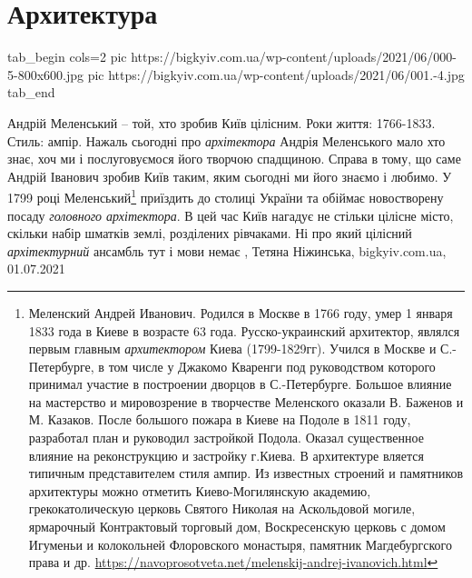  
 
 
 
 
\chapter{Архитектура}


\ifcmt
  tab_begin cols=2
     pic https://bigkyiv.com.ua/wp-content/uploads/2021/06/000-5-800x600.jpg
     pic https://bigkyiv.com.ua/wp-content/uploads/2021/06/001.-4.jpg
  tab_end
\fi

Андрій Меленський – той, хто зробив Київ цілісним.  Роки життя: 1766-1833.
Стиль: ампір.
Нажаль сьогодні про \emph{архітектора} Андрія Меленського мало хто знає, хоч ми і
послуговуємося його творчою спадщиною. Справа в тому, що саме Андрій Іванович
зробив Київ таким, яким сьогодні ми його знаємо і любимо.
У 1799 році Меленський\footnote{
Меленский Андрей Иванович. Родился в Москве в 1766 году, умер 1 января 1833
года в Киеве в возрасте 63 года. Русско-украинский архитектор, являлся первым
главным \emph{архитектором} Киева (1799-1829гг).  Учился в Москве и С.-Петербурге, в
том числе у Джакомо Кваренги под руководством которого принимал участие в
построении дворцов в С.-Петербурге. Большое влияние на мастерство и
мировозрение в творчестве Меленского оказали В. Баженов и М. Казаков. После
большого пожара в Киеве на Подоле в 1811 году, разработал план и руководил
застройкой Подола. Оказал существенное влияние на реконструкцию и застройку
г.Киева.  В архитектуре вляется типичным представителем стиля ампир. Из
известных строений и памятников архитектуры можно отметить Киево-Могилянскую
академию, грекокатолическую церковь Святого Николая на Аскольдовой могиле,
ярмарочный Контрактовый торговый дом, Воскресенскую церковь с домом Игуменьи и
колокольней Флоровского монастыря, памятник Магдебургского права и др.
\url{https://navoprosotveta.net/melenskij-andrej-ivanovich.html}
} приїздить до столиці України та обіймає новостворену
посаду \emph{головного архітектора}. В цей час Київ нагадує не стільки цілісне місто,
скільки набір шматків землі, розділених рівчаками. Ні про який цілісний
\emph{архітектурний} ансамбль тут і мови немає
, 
Тетяна Ніжинська, bigkyiv.com.ua, 01.07.2021

